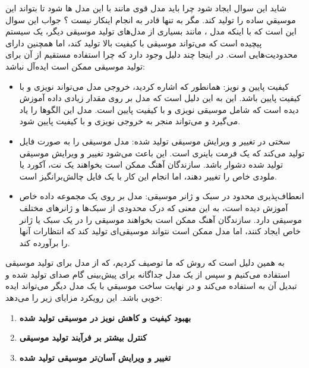 شاید این سوال ایجاد شود چرا باید مدل قوی مانند  با این مدل ها  شود تا بتواند این موسیقي ساده را تولید کند. مگر به تنها قادر به انجام اینکار نیست ؟ جواب این سوال این است که با اینکه
مدل ، مانند بسیاری از مدل‌های تولید موسیقی دیگر، یک سیستم پیچیده
است که می‌تواند موسیقی با کیفیت بالا تولید کند، اما همچنین دارای
محدودیت‌هایی است. در اینجا چند دلیل وجود دارد که چرا استفاده مستقیم از آن
برای تولید موسیقی ممکن است ایده‌آل نباشد:


\begin{itemize}
      \item{کیفیت پایین و نویز}: همانطور که اشاره کردید، خروجی مدل
             می‌تواند نویزی و با کیفیت پایین باشد. این به این دلیل است که
            مدل بر روی مقدار زیادی داده آموزش دیده است که شامل موسیقی نویزی و با
            کیفیت پایین است. مدل این الگوها را یاد می‌گیرد و می‌تواند منجر به خروجی
            نویزی و با کیفیت پایین شود.
      \item{سختی در تغییر و ویرایش موسیقی تولید شده}: مدل  موسیقی
            را به صورت فایل  تولید می‌کند که یک فرمت باینری است. این باعث می‌شود
            تغییر و ویرایش موسیقی تولید شده دشوار باشد. سازندگان آهنگ ممکن است
            بخواهند یک نت، آکورد یا ملودی خاص را تغییر دهند، اما انجام این کار با
            یک فایل  چالش‌برانگیز است.
      \item{انعطاف‌پذیری محدود در سبک و ژانر موسیقی}: مدل  بر روی
            یک مجموعه داده خاص آموزش دیده است، به این معنی که درک محدودی از سبک‌ها
            و ژانرهای مختلف موسیقی دارد. سازندگان آهنگ ممکن است بخواهند موسیقی را
            در یک سبک یا ژانر خاص ایجاد کنند، اما مدل  ممکن است نتواند
            موسیقی‌ای تولید کند که انتظارات آنها را برآورده کند.
\end{itemize}

به همین دلیل است که روش که ما توصیف کردیم، که از مدل  برای
تولید موسیقی استفاده می‌کنیم و سپس از یک مدل جداگانه
برای پیش‌بینی گام صدای تولید شده و تبدیل آن
به  استفاده می‌کند و در نهایت ساخت موسیقي  با یک مدل دیگر می‌تواند ایده خوبی باشد. این رویکرد مزایای زیر را می‌دهد:

\begin{enumerate}
      \def\labelenumi{\arabic{enumi}.}
      \item
            \textbf{بهبود کیفیت و کاهش نویز در موسیقی تولید شده}
      \item
            \textbf{کنترل بیشتر بر فرآیند تولید موسیقی}
      \item
            \textbf{تغییر و ویرایش آسان‌تر موسیقی تولید شده}
\end{enumerate}

